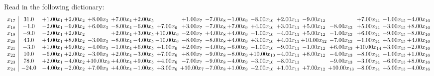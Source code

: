 \documentclass[9pt]{article}
\begin{document}
Read in the following dictionary:
\[\begin{array}{c| c c@{\hskip 2pt} c@{\hskip 2pt} c@{\hskip 2pt} c@{\hskip 2pt} c@{\hskip 2pt} c@{\hskip 2pt} c@{\hskip 2pt} c@{\hskip 2pt} c@{\hskip 2pt} c@{\hskip 2pt} c@{\hskip 2pt} c@{\hskip 2pt} c@{\hskip 2pt} c@{\hskip 2pt} c@{\hskip 2pt} c@{\hskip 2pt} }
 x_{17}   &  31.0 & +  1.00 x_{1} & +  2.00 x_{2} & +  8.00 x_{3} & +  7.00 x_{4} & +  2.00 x_{5} &   & +  1.00 x_{7} & -7.00 x_{8} & -1.00 x_{9} & -8.00 x_{10} & +  2.00 x_{11} & -9.00 x_{12} &   & +  7.00 x_{14} & -1.00 x_{15} & -4.00 x_{16}\\
 x_{18}   &  -1.0 & -2.00 x_{1} & -9.00 x_{2} & +  6.00 x_{3} & -8.00 x_{4} & -6.00 x_{5} & +  7.00 x_{6} & +  3.00 x_{7} & -7.00 x_{8} & +  7.00 x_{9} & +  4.00 x_{10} & +  3.00 x_{11} & +  5.00 x_{12} & -8.00 x_{13} & +  5.00 x_{14} & -3.00 x_{15} & +  8.00 x_{16}\\
 x_{19}   &  -9.0 & -2.00 x_{1} & +  2.00 x_{2} &   & +  2.00 x_{4} & +  3.00 x_{5} & + 10.00 x_{6} & -2.00 x_{7} & +  4.00 x_{8} & +  4.00 x_{9} & -1.00 x_{10} & -4.00 x_{11} & +  5.00 x_{12} & -1.00 x_{13} & +  6.00 x_{14} & -9.00 x_{15} & -8.00 x_{16}\\
 x_{20}   &  43.0 & +  4.00 x_{1} & +  8.00 x_{2} & -3.00 x_{3} & -8.00 x_{4} & -4.00 x_{5} & -10.00 x_{6} & -8.00 x_{7} & -8.00 x_{8} & +  4.00 x_{9} & +  3.00 x_{10} & +  4.00 x_{11} & + 10.00 x_{12} & -7.00 x_{13} & -1.00 x_{14} & +  5.00 x_{15} & +  4.00 x_{16}\\
 x_{21}   &  -3.0 & +  1.00 x_{1} & +  9.00 x_{2} & -4.00 x_{3} & -1.00 x_{4} & +  6.00 x_{5} & +  1.00 x_{6} & +  2.00 x_{7} & -4.00 x_{8} & -6.00 x_{9} & -1.00 x_{10} & -9.00 x_{11} & -1.00 x_{12} & +  6.00 x_{13} & + 10.00 x_{14} & +  3.00 x_{15} & -2.00 x_{16}\\
 x_{22}   &  10.0 & -6.00 x_{1} & +  2.00 x_{2} & -3.00 x_{3} & +  2.00 x_{4} & -3.00 x_{5} & +  7.00 x_{6} & +  8.00 x_{7} & -9.00 x_{8} & -8.00 x_{9} & + 10.00 x_{10} & -4.00 x_{11} & +  8.00 x_{12} & -4.00 x_{13} & -8.00 x_{14} & -1.00 x_{15} & +  1.00 x_{16}\\
 x_{23}   &  78.0 & +  2.00 x_{1} & -4.00 x_{2} & + 10.00 x_{3} & +  4.00 x_{4} & +  9.00 x_{5} & +  4.00 x_{6} & -7.00 x_{7} & -9.00 x_{8} & -4.00 x_{9} & -3.00 x_{10} & -8.00 x_{11} &   & -9.00 x_{13} & -3.00 x_{14} & -6.00 x_{15} & +  8.00 x_{16}\\
 x_{24}   &  -24.0 & -4.00 x_{1} & -2.00 x_{2} & +  7.00 x_{3} & +  4.00 x_{4} & -1.00 x_{5} & +  3.00 x_{6} & + 10.00 x_{7} & -7.00 x_{8} & +  1.00 x_{9} & -2.00 x_{10} & +  1.00 x_{11} & +  7.00 x_{12} & + 10.00 x_{13} & -8.00 x_{14} & +  5.00 x_{15} & -4.00 x_{16}\\

\end{array}\]
\end{document}
